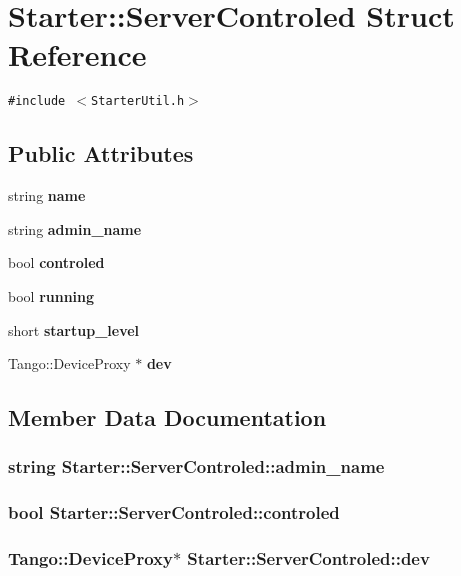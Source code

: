 \section{Starter::Server\-Controled  Struct Reference}
\label{structStarter_1_1ServerControled}
{\tt \#include $<$Starter\-Util.h$>$}

\subsection*{Public Attributes}
\begin{CompactItemize}
\item 
string {\bf name}
\item 
string {\bf admin\_\-name}
\item 
bool {\bf controled}
\item 
bool {\bf running}
\item 
short {\bf startup\_\-level}
\item 
Tango::Device\-Proxy $\ast$ {\bf dev}
\end{CompactItemize}


\subsection{Member Data Documentation}
\subsubsection{\setlength{\rightskip}{0pt plus 5cm}string Starter::Server\-Controled::admin\_\-name}\label{structStarter_1_1ServerControled_m1}


\subsubsection{\setlength{\rightskip}{0pt plus 5cm}bool Starter::Server\-Controled::controled}\label{structStarter_1_1ServerControled_m2}


\subsubsection{\setlength{\rightskip}{0pt plus 5cm}Tango::Device\-Proxy$\ast$ Starter::Server\-Controled::dev}\label{structStarter_1_1ServerControled_m5}


